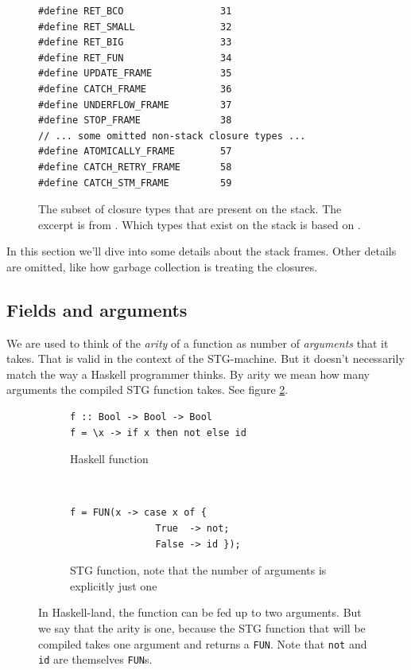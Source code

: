\begin{figure}
\begin{mdframed}
  \begin{verbatim}
#define RET_BCO                 31
#define RET_SMALL               32
#define RET_BIG                 33
#define RET_FUN                 34
#define UPDATE_FRAME            35
#define CATCH_FRAME             36
#define UNDERFLOW_FRAME         37
#define STOP_FRAME              38
// ... some omitted non-stack closure types ...
#define ATOMICALLY_FRAME        57
#define CATCH_RETRY_FRAME       58
#define CATCH_STM_FRAME         59
  \end{verbatim}
  \caption{The subset of closure types that are present on the stack.
The excerpt is from \cite{github_closure_types}. Which types that exist
on the stack is based on \cite{github_scavenge_stack}.}
  \label{fig:stack_types}
\end{mdframed}
\end{figure}


In this section we'll dive into
some details about the stack frames. Other details
are omitted, like how garbage collection is treating the closures.

\subsection{Fields and arguments}

We are used to think of the \emph{arity} of a function as number
of \emph{arguments} that it takes. That is valid in the context of the
STG-machine. But it doesn't necessarily match the way a Haskell
programmer thinks. By arity we mean how many arguments the compiled
STG function takes. See figure \ref{fig:tricky_arity}. \cite{commentary_function_calls}

\begin{figure}
\begin{mdframed}
        \begin{subfigure}[t]{0.5\textwidth}
          \begin{verbatim}
f :: Bool -> Bool -> Bool
f = \x -> if x then not else id
          \end{verbatim}
          \caption{Haskell function}
        \end{subfigure}
    ~ %
        \begin{subfigure}[t]{0.5\textwidth}
          \begin{verbatim}
f = FUN(x -> case x of {
               True  -> not;
               False -> id });
          \end{verbatim}
          \caption{STG function, note that the number of arguments is
explicitly just one}
        \end{subfigure}
  \caption{In Haskell-land, the function can be fed up to two arguments.
  But we say that the arity is one, because the STG function that will be
  compiled takes one argument and returns a \texttt{FUN}. Note that \texttt{not}
  and \texttt{id} are themselves \texttt{FUN}s.
 }
  \label{fig:tricky_arity}
\end{mdframed}
\end{figure}

